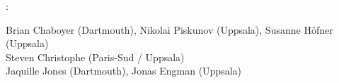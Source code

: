 \vspace{\baselineskip}

:
\begin{flushright}
    \parbox{0.99\linewidth}{
	 Brian Chaboyer (Dartmouth), Nikolai Piskunov (Uppsala), Susanne H\"{o}fner (Uppsala) \\
	 Steven Christophe (Paris-Sud / Uppsala) \\
	 Jaquille Jones (Dartmouth), Jonas Engman (Uppsala) 
	}
	
\end{flushright}

